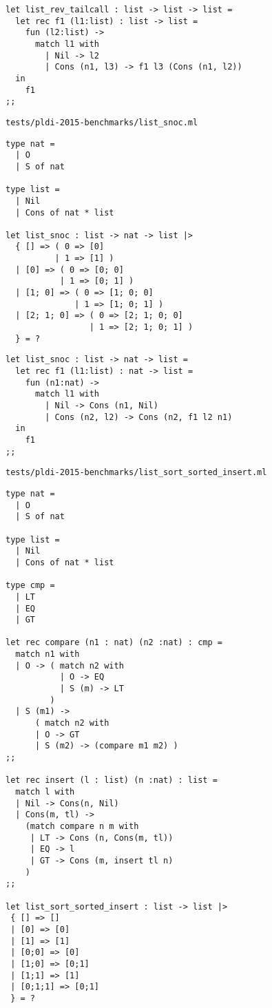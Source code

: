 \begin{verbatim}
let list_rev_tailcall : list -> list -> list =
  let rec f1 (l1:list) : list -> list =
    fun (l2:list) ->
      match l1 with
        | Nil -> l2
        | Cons (n1, l3) -> f1 l3 (Cons (n1, l2))
  in
    f1
;;
\end{verbatim}

\noindent\large\texttt{tests/pldi-2015-benchmarks/list\_snoc.ml}
\begin{verbatim}
type nat =
  | O
  | S of nat

type list =
  | Nil
  | Cons of nat * list

let list_snoc : list -> nat -> list |>
  { [] => ( 0 => [0]
          | 1 => [1] )
  | [0] => ( 0 => [0; 0]
           | 1 => [0; 1] )
  | [1; 0] => ( 0 => [1; 0; 0]
              | 1 => [1; 0; 1] )
  | [2; 1; 0] => ( 0 => [2; 1; 0; 0]
                 | 1 => [2; 1; 0; 1] )
  } = ?
\end{verbatim}

\begin{verbatim}
let list_snoc : list -> nat -> list =
  let rec f1 (l1:list) : nat -> list =
    fun (n1:nat) ->
      match l1 with
        | Nil -> Cons (n1, Nil)
        | Cons (n2, l2) -> Cons (n2, f1 l2 n1)
  in
    f1
;;
\end{verbatim}

\noindent\large\texttt{tests/pldi-2015-benchmarks/list\_sort\_sorted\_insert.ml}
\begin{verbatim}
type nat =
  | O
  | S of nat

type list =
  | Nil
  | Cons of nat * list

type cmp =
  | LT
  | EQ
  | GT

let rec compare (n1 : nat) (n2 :nat) : cmp =
  match n1 with
  | O -> ( match n2 with
           | O -> EQ
           | S (m) -> LT
         )
  | S (m1) ->
      ( match n2 with
      | O -> GT
      | S (m2) -> (compare m1 m2) )
;;

let rec insert (l : list) (n :nat) : list =
  match l with
  | Nil -> Cons(n, Nil)
  | Cons(m, tl) ->
    (match compare n m with
     | LT -> Cons (n, Cons(m, tl))
     | EQ -> l
     | GT -> Cons (m, insert tl n)
    )
;;

let list_sort_sorted_insert : list -> list |>
 { [] => []
 | [0] => [0]
 | [1] => [1]
 | [0;0] => [0]
 | [1;0] => [0;1]
 | [1;1] => [1]
 | [0;1;1] => [0;1]
 } = ?
\end{verbatim}

